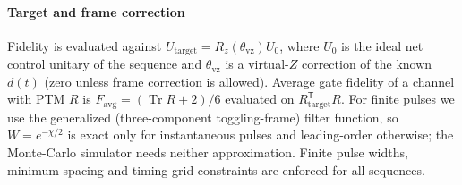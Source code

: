\paragraph{Target and frame correction} Fidelity is evaluated against
$U_{\mathrm{target}}=R_z(\theta_{\mathrm{vz}})U_0$, where $U_0$ is the ideal net control
unitary of the sequence and $\theta_{\mathrm{vz}}$ is a virtual-$Z$ correction of the known
$d(t)$ (zero unless frame correction is allowed). Average gate fidelity of a channel with PTM
$R$ is $F_{\mathrm{avg}}=(\operatorname{Tr}R+2)/6$ evaluated on $R_{\mathrm{target}}^{\mathsf T}R$.
For finite pulses we use the generalized (three-component toggling-frame) filter function, so
$W=e^{-\chi/2}$ is exact only for instantaneous pulses and leading-order otherwise; the
Monte-Carlo simulator needs neither approximation.
Finite pulse widths, minimum spacing and timing-grid constraints are enforced for all sequences.
